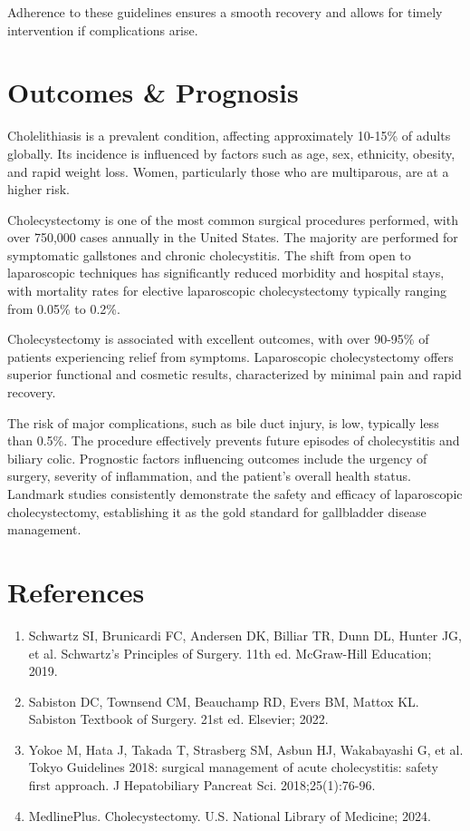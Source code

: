 Adherence to these guidelines ensures a smooth recovery and allows for timely intervention if complications arise.

\section*{Outcomes \& Prognosis}
Cholelithiasis is a prevalent condition, affecting approximately 10-15\% of adults globally. Its incidence is influenced by factors such as age, sex, ethnicity, obesity, and rapid weight loss. Women, particularly those who are multiparous, are at a higher risk.

Cholecystectomy is one of the most common surgical procedures performed, with over 750,000 cases annually in the United States. The majority are performed for symptomatic gallstones and chronic cholecystitis. The shift from open to laparoscopic techniques has significantly reduced morbidity and hospital stays, with mortality rates for elective laparoscopic cholecystectomy typically ranging from 0.05\% to 0.2\%.

Cholecystectomy is associated with excellent outcomes, with over 90-95\% of patients experiencing relief from symptoms. Laparoscopic cholecystectomy offers superior functional and cosmetic results, characterized by minimal pain and rapid recovery.

The risk of major complications, such as bile duct injury, is low, typically less than 0.5\%. The procedure effectively prevents future episodes of cholecystitis and biliary colic. Prognostic factors influencing outcomes include the urgency of surgery, severity of inflammation, and the patient's overall health status. Landmark studies consistently demonstrate the safety and efficacy of laparoscopic cholecystectomy, establishing it as the gold standard for gallbladder disease management.

\section*{References}
\begin{enumerate}
  \item Schwartz SI, Brunicardi FC, Andersen DK, Billiar TR, Dunn DL, Hunter JG, et al. Schwartz's Principles of Surgery. 11th ed. McGraw-Hill Education; 2019.
  \item Sabiston DC, Townsend CM, Beauchamp RD, Evers BM, Mattox KL. Sabiston Textbook of Surgery. 21st ed. Elsevier; 2022.
  \item Yokoe M, Hata J, Takada T, Strasberg SM, Asbun HJ, Wakabayashi G, et al. Tokyo Guidelines 2018: surgical management of acute cholecystitis: safety first approach. J Hepatobiliary Pancreat Sci. 2018;25(1):76-96.
  \item MedlinePlus. Cholecystectomy. U.S. National Library of Medicine; 2024.
\end{enumerate}

\clearpage

